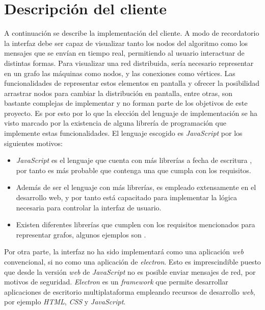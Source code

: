 \section{Descripción del cliente}

A continuación se describe la implementación del cliente. A modo de recordatorio la interfaz debe ser capaz de visualizar tanto los nodos del algoritmo como los mensajes que se envían en tiempo real, permitiendo al usuario interactuar de distintas formas. Para visualizar una red distribuida, sería necesario representar en un grafo las máquinas como nodos, y las conexiones como vértices. Las funcionalidades de representar estos elementos en pantalla y ofrecer la posibilidad arrastrar nodos para cambiar la distribución en pantalla, entre otras, son bastante complejas de implementar y no forman parte de los objetivos de este proyecto. Es por esto por lo que la elección del lenguaje de implementación se ha visto marcado por la existencia de alguna librería de programación que implemente estas funcionalidades. El lenguaje escogido es \textit{JavaScript} por los siguientes motivos:

\begin{itemize}
\item \textit{JavaScript}\cite{js} es el lenguaje que cuenta con más librerías a fecha de escritura \cite{libraries}, por tanto es más probable que contenga una que cumpla con los requisitos.

\item Además de ser el lenguaje con más librerías, es empleado extensamente en el desarrollo web, y por tanto está capacitado para implementar la lógica necesaria para controlar la interfaz de usuario.

\item Existen diferentes librerías que cumplen con los requisitos mencionados para representar grafos, algunos ejemplos son \cite{visjs}\cite{gojs}\cite{10.1093/bioinformatics/btv557}.
\end{itemize}

Por otra parte, la interfaz no ha sido implementará como una aplicación \textit{web} convencional, si no como una aplicación de \textit{electron}. Esto es imprescindible puesto que desde la versión \textit{web} de \textit{JavaScript} no es posible enviar mensajes de red, por motivos de seguridad. \textit{Electron}\cite{electron} es un \textit{framework} que permite desarrollar aplicaciones de escritorio multiplataforma empleando recursos de desarrollo \textit{web}, por ejemplo \textit{HTML}, \textit{CSS} y \textit{JavaScript}.

